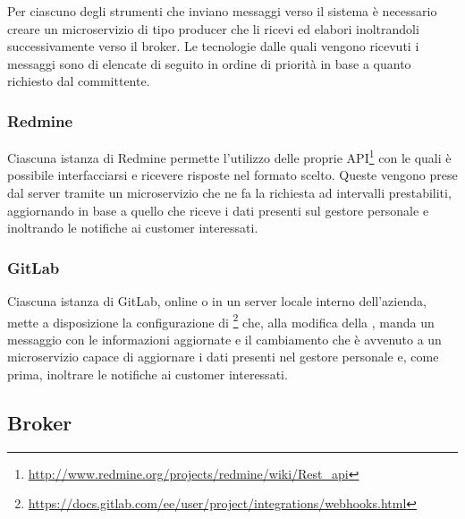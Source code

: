 		Per ciascuno degli strumenti che inviano messaggi verso il sistema è necessario creare un microservizio di tipo producer che li ricevi ed elabori inoltrandoli successivamente verso il broker.
		Le tecnologie dalle quali vengono ricevuti i messaggi sono di elencate di seguito in ordine di priorità in base a quanto richiesto dal committente.

		\subsubsection{Redmine}
		Ciascuna istanza di Redmine permette l'utilizzo delle proprie API\footnote{\url{http://www.redmine.org/projects/redmine/wiki/Rest_api}} con le quali è possibile interfacciarsi e ricevere risposte nel formato scelto.
		Queste vengono prese dal server tramite un microservizio che ne fa la richiesta ad intervalli prestabiliti, aggiornando in base a quello che riceve i dati presenti sul gestore personale e inoltrando le notifiche ai customer interessati.
		
		\subsubsection{GitLab}
		Ciascuna istanza di GitLab, online o in un server locale interno dell'azienda, mette a disposizione la configurazione di \footnote{\url{https://docs.gitlab.com/ee/user/project/integrations/webhooks.html}} che, alla modifica della , manda un messaggio con le informazioni aggiornate e il cambiamento che è avvenuto a un microservizio capace di aggiornare i dati presenti nel gestore personale e, come prima, inoltrare le notifiche ai customer interessati.
		
		
	\subsection{Broker}
	
